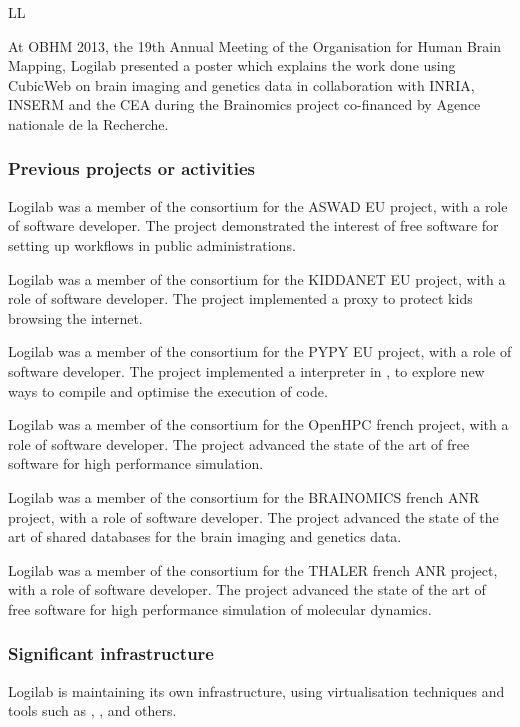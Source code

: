 \begin{sitedescription}{LL}
\begin{compactenum}
 \item At OBHM 2013, the 19th Annual Meeting of the Organisation for Human Brain
   Mapping, Logilab presented a poster which explains the work done using
   CubicWeb on brain imaging and genetics data in collaboration with INRIA,
   INSERM and the CEA during the Brainomics project co-financed by Agence
   nationale de la Recherche.

\end{compactenum}

\subsubsection*{Previous projects or activities}

\begin{compactenum}
\item Logilab was a member of the consortium for the ASWAD EU project, with a
  role of software developer. The project demonstrated the interest of free
  software for setting up workflows in public administrations.
\item Logilab was a member of the consortium for the KIDDANET EU project, with a
  role of software developer. The project implemented a proxy to protect kids
  browsing the internet.
\item Logilab was a member of the consortium for the PYPY EU project, with a
  role of software developer. The project implemented a \Python interpreter in
  \Python, to explore new ways to compile and optimise the execution of \Python
  code.
\item Logilab was a member of the consortium for the OpenHPC french project,
  with a role of software developer. The project advanced the state of the art
  of free software for high performance simulation.
\item Logilab was a member of the consortium for the BRAINOMICS french ANR
  project, with a role of software developer. The project advanced the state of
  the art of shared databases for the brain imaging and genetics data.
\item Logilab was a member of the consortium for the THALER french ANR project,
  with a role of software developer. The project advanced the state of the art
  of free software for high performance simulation of molecular dynamics.
\end{compactenum}

\subsubsection*{Significant infrastructure}

Logilab is maintaining its own infrastructure, using virtualisation techniques
and tools such as , , 
and others.

\end{sitedescription}





